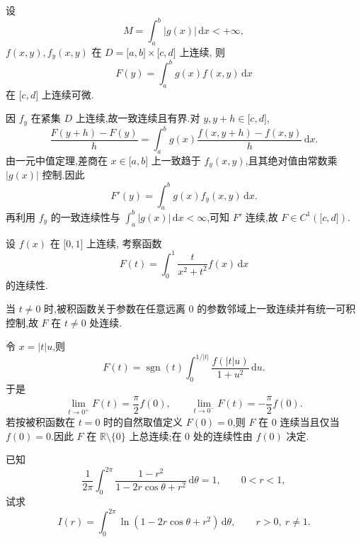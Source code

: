 \begin{example}
    设
    \[
        M=\int_a^b|g(x)|\,\mathrm{d}x<+\infty,
    \]
    $f(x,y),f_y(x,y)$ 在 $D=\lbrack a,b\rbrack\times\lbrack c,d\rbrack$ 上连续, 则
    \[
        F(y)=\int_a^b g(x)f(x,y)\,\mathrm{d}x
    \]
    在 $\lbrack c,d\rbrack$ 上连续可微.
\end{example}
\exampleblank

\begin{solution}
    因 $f_y$ 在紧集 $D$ 上连续,故一致连续且有界.对 $y,y+h\in\lbrack c,d\rbrack$,
    \[
        \dfrac{F(y+h)-F(y)}{h}
        =\int_a^b g(x)\dfrac{f(x,y+h)-f(x,y)}{h}\,\mathrm{d}x.
    \]
    由一元中值定理,差商在 $x\in\lbrack a,b\rbrack$ 上一致趋于 $f_y(x,y)$,且其绝对值由常数乘 $|g(x)|$ 控制.因此
    \[
        F'(y)=\int_a^b g(x)f_y(x,y)\,\mathrm{d}x.
    \]
    再利用 $f_y$ 的一致连续性与 $\displaystyle\int_a^b|g(x)|\,\mathrm{d}x<\infty$,可知 $F'$ 连续,故 $F\in C^1(\lbrack c,d\rbrack)$.
\end{solution}

\begin{example}
    设 $f(x)$ 在 $\lbrack0,1\rbrack$ 上连续, 考察函数
    \[
        F(t)=\int_0^1\dfrac{t}{x^2+t^2}f(x)\,\mathrm{d}x
    \]
    的连续性.
\end{example}
\exampleblank

\begin{solution}
    当 $t\neq0$ 时,被积函数关于参数在任意远离 $0$ 的参数邻域上一致连续并有统一可积控制,故 $F$ 在 $t\neq0$ 处连续.

    令 $x=|t|u$,则
    \[
        F(t)=\operatorname{sgn}(t)\int_0^{1/|t|}\dfrac{f(|t|u)}{1+u^2}\,\mathrm{d}u.
    \]
    于是
    \[
        \displaystyle\lim\limits_{t\to0^+}F(t)=\dfrac{\pi}{2}f(0),
        \qquad
        \lim\limits_{t\to0^-}F(t)=-\dfrac{\pi}{2}f(0).
    \]
    若按被积函数在 $t=0$ 时的自然取值定义 $F(0)=0$,则 $F$ 在 $0$ 连续当且仅当 $f(0)=0$.因此 $F$ 在
    $\mathbb{R}\setminus\{0\}$ 上总连续;在 $0$ 处的连续性由 $f(0)$ 决定.
\end{solution}

\begin{example}
    已知
    \[
        \dfrac{1}{2\pi}\int_0^{2\pi}\dfrac{1-r^2}{1-2r\cos\theta+r^2}\,\mathrm{d}\theta=1,
        \qquad 0<r<1,
    \]
    试求
    \[
        I(r)=\int_0^{2\pi}\ln(1-2r\cos\theta+r^2)\,\mathrm{d}\theta,
        \qquad r>0,\ r\ne1.
    \]
\end{example}
\exampleblank

